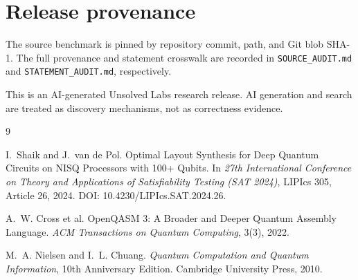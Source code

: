 \documentclass[11pt]{article}
\begin{document}
\section{Release provenance}

The source benchmark is pinned by repository commit, path, and Git blob SHA-1.
The full provenance and statement crosswalk are recorded in
\texttt{SOURCE\_AUDIT.md} and \texttt{STATEMENT\_AUDIT.md}, respectively.

This is an AI-generated Unsolved Labs research release.  AI generation and
search are treated as discovery mechanisms, not as correctness evidence.

\begin{thebibliography}{9}

I.~Shaik and J.~van de Pol.
\newblock Optimal Layout Synthesis for Deep Quantum Circuits on NISQ
Processors with 100+ Qubits.
\newblock In \emph{27th International Conference on Theory and Applications
of Satisfiability Testing (SAT 2024)}, LIPIcs 305, Article 26, 2024.
\newblock DOI: 10.4230/LIPIcs.SAT.2024.26.

A.~W. Cross et al.
\newblock OpenQASM 3: A Broader and Deeper Quantum Assembly Language.
\newblock \emph{ACM Transactions on Quantum Computing}, 3(3), 2022.

M.~A. Nielsen and I.~L. Chuang.
\newblock \emph{Quantum Computation and Quantum Information}, 10th
Anniversary Edition.
\newblock Cambridge University Press, 2010.

\end{thebibliography}
\end{document}

